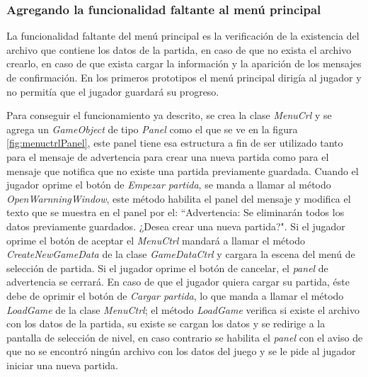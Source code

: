\subsubsection{Agregando la funcionalidad faltante al menú principal}
La funcionalidad faltante del menú principal es la verificación de la existencia del archivo que contiene los datos de la partida, en caso de que no exista el archivo crearlo, en caso de que exista cargar la información y la aparición de los mensajes de confirmación. En los primeros prototipos el menú principal dirigía al jugador y no permitía que el jugador guardará su progreso.
\\
\par
Para conseguir el funcionamiento ya descrito, se crea la clase \textit{MenuCrl} 
y se agrega un \textit{GameObject} de tipo \textit{Panel} como el que se ve en 
la figura \ref{fig:menuctrlPanel}, este panel tiene esa estructura a fin de ser 
utilizado tanto para el mensaje de advertencia para crear una nueva partida como 
para el mensaje que notifica que no existe una partida previamente guardada.
Cuando el jugador oprime el botón de \textit{Empezar partida}, se manda a llamar 
al método \textit{OpenWarnningWindow}, este método habilita el panel del mensaje 
y modifica el texto que se muestra en el panel por el: “Advertencia: Se 
eliminarán todos los datos previamente guardados. ¿Desea crear una nueva 
partida?". Si el jugador oprime el botón de aceptar el \textit{MenuCtrl} mandará 
a llamar el método \textit{CreateNewGameData} de la clase \textit{GameDataCtrl} 
y cargara la escena del menú de selección de partida. Si el jugador oprime el 
botón de cancelar, el \textit{panel} de advertencia se cerrará. En caso de que 
el jugador quiera cargar su partida, éste debe de oprimir el botón de 
\textit{Cargar partida}, lo que manda a llamar el método \textit{LoadGame} de la 
clase \textit{MenuCtrl}; el método \textit{LoadGame} verifica si existe el 
archivo con los datos de la partida, su existe se cargan los datos y se redirige 
a la pantalla de selección de nivel, en caso contrario se habilita el 
\textit{panel} con el aviso de que no se encontró ningún archivo con los datos 
del juego y se le pide al jugador iniciar una nueva partida. 

